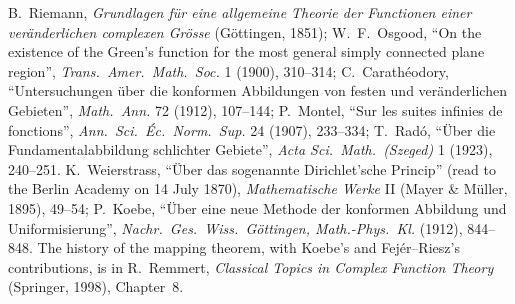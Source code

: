 B.~Riemann, \emph{Grundlagen f\"ur eine allgemeine Theorie der Functionen einer ver\"anderlichen complexen Gr\"osse} (G\"ottingen, 1851); W.~F.~Osgood, ``On the existence of the Green's
function for the most general simply connected plane region'', \emph{Trans.\ Amer.\ Math.\ Soc.} 1 (1900), 310--314; C.~Carath\'eodory, ``Untersuchungen \"uber die konformen Abbildungen von
festen und ver\"anderlichen Gebieten'', \emph{Math.\ Ann.} 72 (1912), 107--144; P.~Montel, ``Sur les suites infinies de fonctions'', \emph{Ann.\
Sci.\ \'Ec.\ Norm.\ Sup.} 24 (1907), 233--334; T.~Rad\'o, ``\"Uber die Fundamentalabbildung schlichter Gebiete'', \emph{Acta Sci.\ Math.\ (Szeged)} 1 (1923), 240--251. K.~Weierstrass, ``\"Uber das sogenannte Dirichlet'sche Princip'' (read to the Berlin Academy on 14 July 1870), \emph{Mathematische Werke} II (Mayer \& M\"uller, 1895), 49--54; P.~Koebe, ``\"Uber eine neue Methode der konformen Abbildung und Uniformisierung'', \emph{Nachr.\ Ges.\ Wiss.\ G\"ottingen, Math.-Phys.\ Kl.} (1912), 844--848. The history of the mapping theorem, with Koebe's and Fej\'er--Riesz's contributions, is in R.~Remmert,
\emph{Classical Topics in Complex Function Theory} (Springer, 1998), Chapter~8.
